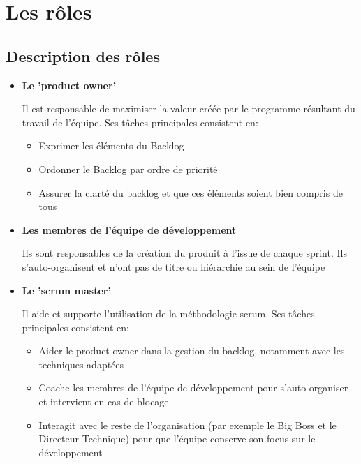 \section{Les rôles}

\subsection{Description des rôles}

\begin{itemize}
      \item \textbf{Le 'product owner'}
      
      Il est responsable de maximiser la valeur créée par le programme résultant du travail de l'équipe. 
      Ses tâches principales consistent en:
      \begin{itemize}
            \item Exprimer les éléments du Backlog
            \item Ordonner le Backlog par ordre de priorité
            \item Assurer la clarté du backlog et que ces éléments soient bien compris de tous
      \end{itemize}

      \item \textbf{Les membres de l'équipe de développement}
      
      Ils sont responsables de la création du produit à l'issue de chaque sprint. 
      Ils s’auto-organisent et n’ont pas de titre ou hiérarchie au sein de l'équipe

      \item \textbf{Le 'scrum master'}
      
      Il aide et supporte l'utilisation de la méthodologie scrum. Ses tâches principales consistent en:
      \begin{itemize}
            \item Aider le product owner dans la gestion du backlog, notamment avec les techniques adaptées
            \item Coache les membres de l'équipe de développement pour s’auto-organiser et intervient en cas de blocage
            \item Interagit avec le reste de l’organisation (par exemple le Big Boss et le Directeur Technique) pour que 
            l'équipe conserve son focus sur le développement
      \end{itemize}

\end{itemize}

